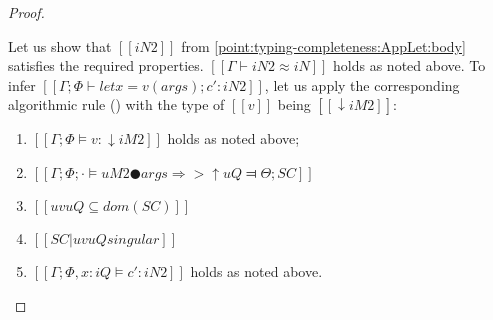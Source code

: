 \begin{proof}
\begin{caseof}
            Let us show that $[[iN2]]$ from \ref{point:typing-completeness:AppLet:body}
            satisfies the required properties.
            $[[Γ ⊢ iN2 ≈ iN]]$ holds as noted above. 
            To infer $[[Γ ; Φ ⊢ let x = v(args); c' : iN2]]$, 
            let us apply the corresponding algorithmic rule ()
            with the type of $[[v]]$ being $[[↓iM2]]$:
            \begin{enumerate}
                \item $[[Γ ; Φ ⊨ v : ↓iM2]]$ holds as noted above;

                \item $[[Γ; Φ ; · ⊨ uM2 ● args ⇒> ↑uQ ⫤ Θ; SC]]$

                \item $[[uv uQ ⊆ dom(SC)]]$
                
                \item $[[SC | uv uQ singular]]$ 

                \item $[[Γ; Φ, x:iQ ⊨ c' : iN2]]$ holds as noted above.
            \end{enumerate}










\end{caseof}
\end{proof}
